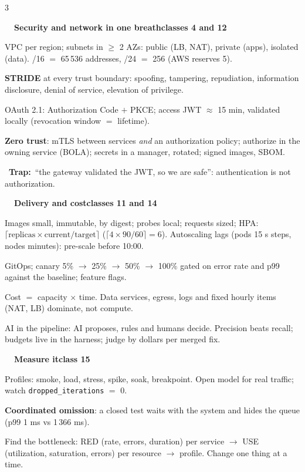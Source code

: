 \documentclass[10pt,a4paper]{article}
\newcommand{\sect}[4]{\par\vspace{.35em}%
  \begin{tcolorbox}[enhanced,colback=#1,colframe=#1,boxrule=0pt,arc=2pt,left=4pt,right=4pt,top=1.5pt,bottom=1.5pt,before skip=0pt,after skip=2pt]
    {\color{white}\small\bfseries #2\ \ #3\hfill{\scriptsize\mdseries #4}}
  \end{tcolorbox}}
\newcommand{\trap}[1]{\par{\color{wrong}\faExclamationTriangle}\ {\color{wrong}\bfseries Trap:}\ #1\par}
\newcommand{\term}[1]{\textbf{#1}}
\begin{document}
\begin{multicols*}{3}
\sect{stD}{\faLock}{Security and network in one breath}{classes 4 and 12}
\begin{bul}
  \item VPC per region; subnets in $\ge$ 2 AZs: public (LB, NAT), private (apps), isolated (data). /16 $=$ 65\,536 addresses, /24 $=$ 256 (AWS reserves 5).
  \item \term{STRIDE} at every trust boundary: spoofing, tampering, repudiation, information disclosure, denial of service, elevation of privilege.
  \item OAuth 2.1: Authorization Code $+$ PKCE; access JWT $\approx$ 15 min, validated locally (revocation window $=$ lifetime).
  \item \term{Zero trust}: mTLS between services \emph{and} an authorization policy; authorize in the owning service (BOLA); secrets in a manager, rotated; signed images, SBOM.
\end{bul}
\trap{``the gateway validated the JWT, so we are safe'': authentication is not authorization.}

\sect{stC}{\faCloud}{Delivery and cost}{classes 11 and 14}
\begin{bul}
  \item Images small, immutable, by digest; probes local; requests sized; HPA: $\lceil \text{replicas} \times \text{current}/\text{target} \rceil$ ($\lceil 4 \times 90/60 \rceil = 6$). Autoscaling lags (pods 15 s steps, nodes minutes): pre-scale before 10:00.
  \item GitOps; canary 5\% $\to$ 25\% $\to$ 50\% $\to$ 100\% gated on error rate and p99 against the baseline; feature flags.
  \item Cost $=$ capacity $\times$ time. Data services, egress, logs and fixed hourly items (NAT, LB) dominate, not compute.
  \item AI in the pipeline: AI proposes, rules and humans decide. Precision beats recall; budgets live in the harness; judge by dollars per merged fix.
\end{bul}

\sect{stD}{\faBolt}{Measure it}{class 15}
\begin{bul}
  \item Profiles: smoke, load, stress, spike, soak, breakpoint. Open model for real traffic; watch \texttt{dropped\_iterations} $=$ 0.
  \item \term{Coordinated omission}: a closed test waits with the system and hides the queue (p99 1 ms vs 1\,366 ms).
  \item Find the bottleneck: RED (rate, errors, duration) per service $\to$ USE (utilization, saturation, errors) per resource $\to$ profile. Change one thing at a time.
\end{bul}



\end{multicols*}
\end{document}
